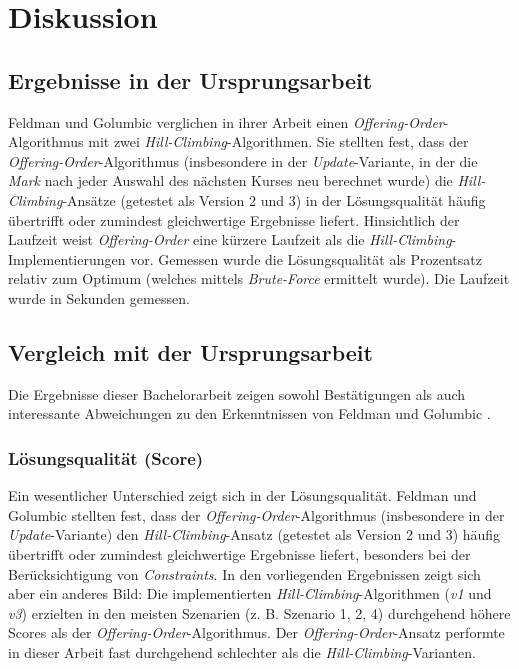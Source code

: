 \section{Diskussion}\label{chap:diskussion}


\subsection{Ergebnisse in der Ursprungsarbeit}

Feldman und Golumbic \cite{feldmangolumbic} verglichen in ihrer Arbeit einen \textit{Offering-Order}-Algorithmus mit zwei \textit{Hill-Climbing}-Algorithmen. Sie stellten fest, dass der \textit{Offering-Order}-Algorithmus (insbesondere in der \textit{Update}-Variante, in der die \textit{Mark} nach jeder Auswahl des nächsten Kurses neu berechnet wurde) die \textit{Hill-Climbing}-Ansätze (getestet als Version 2 und 3) in der Lösungsqualität häufig übertrifft oder zumindest gleichwertige Ergebnisse liefert. Hinsichtlich der Laufzeit weist \textit{Offering-Order} eine kürzere Laufzeit als die \textit{Hill-Climbing}-Implementierungen vor.
Gemessen wurde die Lösungsqualität als Prozentsatz relativ zum Optimum (welches mittels \textit{Brute-Force} ermittelt wurde). Die Laufzeit wurde in Sekunden gemessen.



\subsection{Vergleich mit der Ursprungsarbeit}

Die Ergebnisse dieser Bachelorarbeit zeigen sowohl Bestätigungen als auch interessante Abweichungen zu den Erkenntnissen von Feldman und Golumbic \cite{feldmangolumbic}.


\subsubsection{Lösungsqualität (Score)}

Ein wesentlicher Unterschied zeigt sich in der Lösungsqualität. Feldman und Golumbic stellten fest, dass der \textit{Offering-Order}-Algorithmus (insbesondere in der \textit{Update}-Variante) den \textit{Hill-Climbing}-Ansatz (getestet als Version 2 und 3) häufig übertrifft oder zumindest gleichwertige Ergebnisse liefert, besonders bei der Berücksichtigung von \textit{Constraints}. In den vorliegenden Ergebnissen zeigt sich aber ein anderes Bild: Die implementierten \textit{Hill-Climbing}-Algorithmen (\textit{v1} und \textit{v3}) erzielten in den meisten Szenarien (z. B. Szenario 1, 2, 4) durchgehend höhere Scores als der \textit{Offering-Order}-Algorithmus. Der \textit{Offering-Order}-Ansatz performte in dieser Arbeit fast durchgehend schlechter als die \textit{Hill-Climbing}-Varianten.

